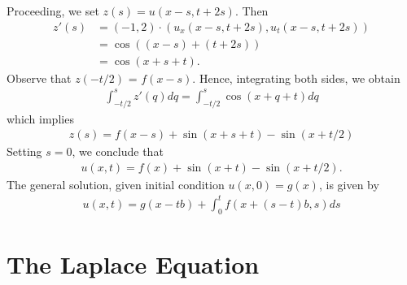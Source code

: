 Proceeding, we set $z(s) = u(x-s, t+2s)$. Then
\begin{equation*}
\begin{split}
	z ' (s) & = (-1,2) \cdot
(u_{x}(x-s, t+2s), u_{t}(x-s, t+2s))
\\
& =  \cos((x-s) + (t + 2s))
\\
& = \cos(x + s + t).
\end{split}
\end{equation*}
Observe that $z(-t/2)$ = $f(x-s)$. Hence, integrating both sides, we obtain
\begin{equation*}
\begin{split}
	\int_{-t/2}^{s} z'(q) dq  = \int_{-t/2}^{s} \cos(x + q + t) dq
\end{split}
\end{equation*}
which implies
\begin{equation*}
\begin{split}
	z(s) = f(x-s) + \sin(x + s + t) - \sin(x + t/2)
\end{split}
\end{equation*}
Setting $s = 0$, we conclude that
\begin{equation*}
\begin{split}
	u(x,t) = f(x) + \sin(x + t) - \sin(x + t/2).
\end{split}
\end{equation*}
The general solution, given initial condition $u(x,0) = g(x)$, is given by
\begin{equation*}
\begin{split}
	u(x,t) = g(x-tb) + \int_{0}^{t} f(x + (s-t)b, s)ds
\end{split}
\end{equation*}

\chapter{The Laplace Equation}
